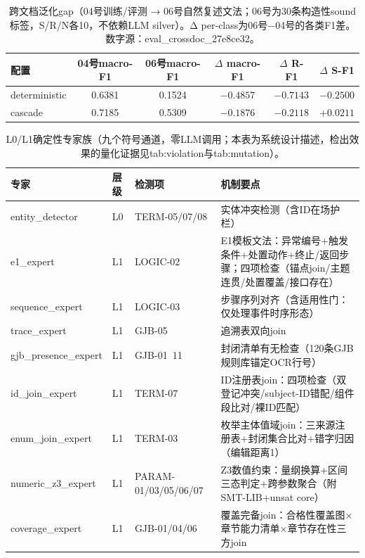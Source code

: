 \begin{table}[t]
\centering
\small
\caption{跨文档泛化gap（04号训练/评测 → 06号自然复述文法；06号为30条构造性sound标签，S/R/N各10，不依赖LLM silver）。Δ per-class为06号−04号的各类F1差。数字源：eval\_crossdoc\_27e8ce32。}
\label{tab:crossdoc}
\begin{tabular}{p{3.5cm}ccccc}
\toprule
配置 & 04号macro-F1 & 06号macro-F1 & $\Delta$ macro-F1 & $\Delta$ R-F1 & $\Delta$ S-F1 \\
\midrule
deterministic & 0.6381 & 0.1524 & \textbf{$ -0.4857 $} & $ -0.7143 $ & $ -0.2500 $ \\
cascade & 0.7185 & 0.5309 & \textbf{$ -0.1876 $} & $ -0.2118 $ & $ +0.0211 $ \\
\bottomrule
\end{tabular}
\end{table}

\begin{table}[t]
\centering
\small
\caption{L0/L1确定性专家族（九个符号通道，零LLM调用；本表为系统设计描述，检出效果的量化证据见tab:violation与tab:mutation）。}
\label{tab:experts}
\begin{tabular}{llp{2.6cm}p{6.2cm}}
\toprule
专家 & 层级 & 检测项 & 机制要点 \\
\midrule
entity\_detector & L0 & TERM-05/07/08 & 实体冲突检测（含ID在场护栏） \\
e1\_expert & L1 & LOGIC-02 & E1模板文法：异常编号+触发条件+处置动作+终止/返回步骤；四项检查（锚点join/主题连贯/处置覆盖/接口存在） \\
sequence\_expert & L1 & LOGIC-03 & 步骤序列对齐（含适用性门：仅处理事件时序形态） \\
trace\_expert & L1 & GJB-05 & 追溯表双向join \\
gjb\_presence\_expert & L1 & GJB-01~11 & 封闭清单有无检查（120条GJB规则库锚定OCR行号） \\
id\_join\_expert & L1 & TERM-07 & ID注册表join：四项检查（双登记冲突/subject-ID错配/组件段比对/裸ID匹配） \\
enum\_join\_expert & L1 & TERM-03 & 枚举主体值域join：三来源注册表+封闭集合比对+错字归因（编辑距离1） \\
numeric\_z3\_expert & L1 & PARAM-01/03/05/06/07 & Z3数值约束：量纲换算+区间三态判定+跨参数聚合（附SMT-LIB+unsat core） \\
coverage\_expert & L1 & GJB-01/04/06 & 覆盖完备join：合格性覆盖图×章节能力清单×章节存在性三方join \\
\bottomrule
\end{tabular}
\end{table}

